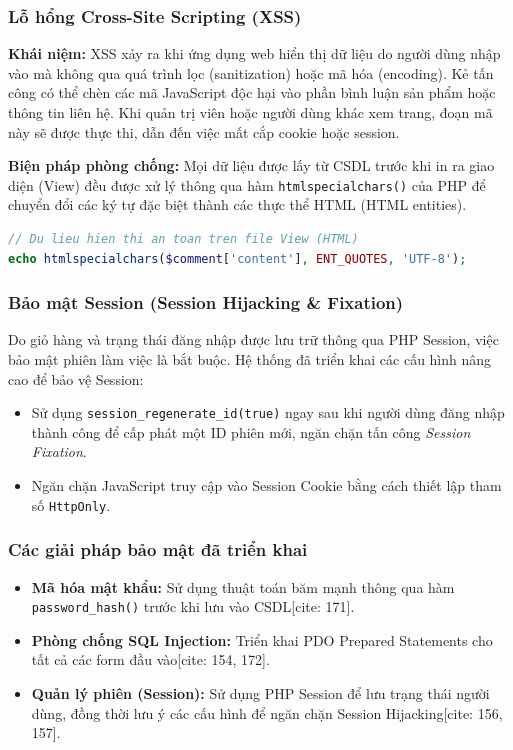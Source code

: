 \subsubsection{Lỗ hổng Cross-Site Scripting (XSS)}
\textbf{Khái niệm:} XSS xảy ra khi ứng dụng web hiển thị dữ liệu do người dùng nhập vào mà không qua quá trình lọc (sanitization) hoặc mã hóa (encoding). Kẻ tấn công có thể chèn các mã JavaScript độc hại vào phần bình luận sản phẩm hoặc thông tin liên hệ. Khi quản trị viên hoặc người dùng khác xem trang, đoạn mã này sẽ được thực thi, dẫn đến việc mất cắp cookie hoặc session.

\textbf{Biện pháp phòng chống:} Mọi dữ liệu được lấy từ CSDL trước khi in ra giao diện (View) đều được xử lý thông qua hàm \texttt{htmlspecialchars()} của PHP để chuyển đổi các ký tự đặc biệt thành các thực thể HTML (HTML entities).

\begin{lstlisting}[language=PHP, basicstyle=\ttfamily\small, frame=single]
// Du lieu hien thi an toan tren file View (HTML)
echo htmlspecialchars($comment['content'], ENT_QUOTES, 'UTF-8');
\end{lstlisting}

\subsubsection{Bảo mật Session (Session Hijacking \& Fixation)}
Do giỏ hàng và trạng thái đăng nhập được lưu trữ thông qua PHP Session, việc bảo mật phiên làm việc là bắt buộc. Hệ thống đã triển khai các cấu hình nâng cao để bảo vệ Session:
\begin{itemize}
    \item Sử dụng \texttt{session\_regenerate\_id(true)} ngay sau khi người dùng đăng nhập thành công để cấp phát một ID phiên mới, ngăn chặn tấn công \textit{Session Fixation}.
    \item Ngăn chặn JavaScript truy cập vào Session Cookie bằng cách thiết lập tham số \texttt{HttpOnly}.
\end{itemize}

\subsubsection{Các giải pháp bảo mật đã triển khai}
\begin{itemize}
    \item \textbf{Mã hóa mật khẩu:} Sử dụng thuật toán băm mạnh thông qua hàm \texttt{password\_hash()} trước khi lưu vào CSDL[cite: 171].
    \item \textbf{Phòng chống SQL Injection:} Triển khai PDO Prepared Statements cho tất cả các form đầu vào[cite: 154, 172].
    \item \textbf{Quản lý phiên (Session):} Sử dụng PHP Session để lưu trạng thái người dùng, đồng thời lưu ý các cấu hình để ngăn chặn Session Hijacking[cite: 156, 157].
\end{itemize}


